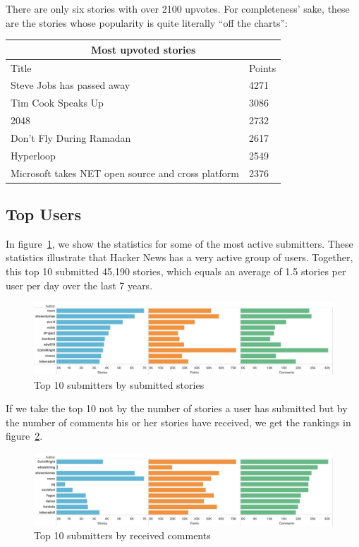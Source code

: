 There are only six stories with over 2100 upvotes. For completeness' sake, these are the stories whose popularity is quite literally ``off the charts'':
\begin{center}
    \begin{tabular}{|p{=8.5cm}|p{2cm}|}
       \hline
       \multicolumn{2}{|c|}{Most upvoted stories} \\
       \hline
       Title 																				& Points \\
       \hline
       Steve Jobs has passed away 										& 4271\\
		Tim Cook Speaks Up														& 3086\\
		2048																			& 2732\\
		Don't Fly During Ramadan											& 2617\\
		Hyperloop																		& 2549\\
		Microsoft takes NET open source and cross platform	& 2376\\
        \hline
    \end{tabular}
\end{center}

\subsection{Top Users}
In figure~\ref{fig:top10ByStories}, we show the statistics for some of the most active submitters. These statistics illustrate that Hacker News has a very active group of users. Together, this top 10 submitted 45,190 stories, which equals an average of 1.5 stories per user per day over the last 7 years.
\begin{figure}[ht!]
	\caption{Top 10 submitters by submitted stories}
	\label{fig:top10ByStories}
	\centering
	\includegraphics[width=14cm]{top10ByStories}
\end{figure}

If we take the top 10 not by the number of stories a user has submitted but by the number of comments his or her stories have received, we get the rankings in figure~\ref{fig:top10ByComments}.

\begin{figure}[ht!]
	\caption{Top 10 submitters by received comments}
	\label{fig:top10ByComments}
	\centering
	\includegraphics[width=14cm]{top10ByComments}
\end{figure}


